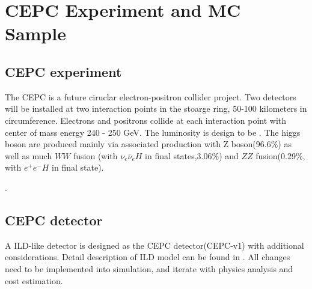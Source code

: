 \section{CEPC Experiment and MC Sample}
\label{sec:CEPC}
\subsection{CEPC experiment}
The CEPC is a future ciruclar electron-positron collider project. Two detectors will be installed at two interaction 
points in the stoarge ring, 50-100 kilometers in circumference. Electrons and positrons collide at each interaction point with center of mass energy 240 - 250 GeV. The luminosity is design to be  \lumiunit.
 The higgs boson are produced mainly via associated production with Z boson(96.6\%) as well as much $WW$ fusion (with $\nu_e\bar{\nu}_e H$ in final states,3.06\%) and $ZZ$ fusion(0.29\%, with $e^+e^-H$ in final state).
 
\cite{CEPC_preCDR}. 

\subsection{CEPC detector}
A ILD-like detector is designed as the CEPC detector(CEPC-v1) with additional considerations\cite{CEPC_preCDR}. Detail description of ILD model can be found in \cite{ILD_detector}. All changes need to be implemented into simulation, and iterate with physics analysis and cost estimation.

